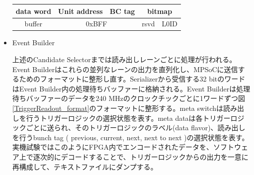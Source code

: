 \begin{itemize}
\begin{table}
\begin{tabular}{|c|cccccccccccccccccccccccccccccccc|}
        data word & \multicolumn{6}{c|}{Unit address}                                                                                                                         & \multicolumn{2}{c|}{BC tag}                       & \multicolumn{24}{c|}{bitmap}                                                                                                                                                                                                                                                                                                                                                                                                                                                                                                                                                                                   \\ \hline
        buffer    & \multicolumn{12}{c|}{0xBFF}                                                                                                                                                                                                                                                                                           & \multicolumn{9}{c|}{rsvd}                                                                                                                                                                                                               & \multicolumn{11}{c|}{L0ID}                                                                                                                                                                                                                                   \\ \hline
        \end{tabular}
    \end{table}

    \item Event Builder　　
    \par
    上述のCandidate Selectorまでは読み出しレーンごとに処理が行われる。Event Builderはこれらの並列なレーンの出力を直列化し、MPSoCに送信するためのフォーマットに整形し直す。Serializerから受信する32 bitのワードはEvent Builder内の処理待ちバッファーに格納される。Event Builderは処理待ちバッファーのデータを240 MHzのクロックチックごとに1ワードずつ図\ref{TriggerReadout_format}のフォーマットに整形する。meta switchは読み出しを行うトリガーロジックの選択状態を表す。meta dataは各トリガーロジックごとに送られ、そのトリガーロジックのラベル(data flavor)、読み出しを行うbunch tag ( previous, current, next, next to next )の選択状態を表す。
    実機試験ではこのようにFPGA内でエンコードされたデータを、ソフトウェア上で逐次的にデコードすることで、トリガーロジックからの出力を一意に再構成して、テキストファイルにダンプする。


\end{itemize}
